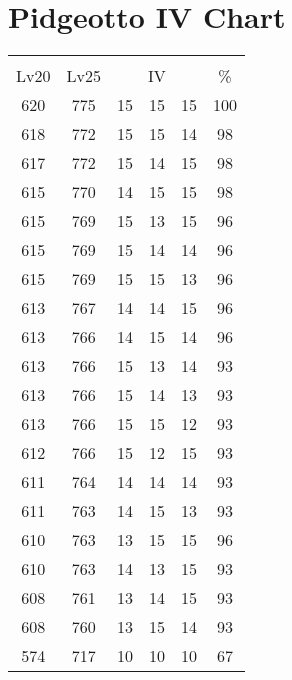 \documentclass{article}%
\begin{document}
%
\normalsize%
\section{Pidgeotto IV Chart}%
\label{sec:Pidgeotto IV Chart}%
\renewcommand{\arraystretch}{1.5}%
\begin{tabular}{|c|c|c|c|c|c|}%
\hline%
\multicolumn{6}{|c|}{\textcolor{white}{ 
\linebreak{Pidgeotto}
}%
\cellcolor{black}}\\%
\multicolumn{1}{|c}{Lv20}&\multicolumn{1}{c|}{Lv25}&\multicolumn{3}{c|}{IV}&\multicolumn{1}{|c|}{\%}\\%
\hline%
\rowcolor{color100}%
620&775&15&15&15&100\\%
\hline%
\rowcolor{color98}%
618&772&15&15&14&98\\%
\hline%
\rowcolor{color98}%
617&772&15&14&15&98\\%
\hline%
\rowcolor{color98}%
615&770&14&15&15&98\\%
\hline%
\rowcolor{color96}%
615&769&15&13&15&96\\%
\hline%
\rowcolor{color96}%
615&769&15&14&14&96\\%
\hline%
\rowcolor{color96}%
615&769&15&15&13&96\\%
\hline%
\rowcolor{color96}%
613&767&14&14&15&96\\%
\hline%
\rowcolor{color96}%
613&766&14&15&14&96\\%
\hline%
\rowcolor{color93}%
613&766&15&13&14&93\\%
\hline%
\rowcolor{color93}%
613&766&15&14&13&93\\%
\hline%
\rowcolor{color93}%
613&766&15&15&12&93\\%
\hline%
\rowcolor{color93}%
612&766&15&12&15&93\\%
\hline%
\rowcolor{color93}%
611&764&14&14&14&93\\%
\hline%
\rowcolor{color93}%
611&763&14&15&13&93\\%
\hline%
\rowcolor{color96}%
610&763&13&15&15&96\\%
\hline%
\rowcolor{color93}%
610&763&14&13&15&93\\%
\hline%
\rowcolor{color93}%
608&761&13&14&15&93\\%
\hline%
\rowcolor{color93}%
608&760&13&15&14&93\\%
\hline%
\rowcolor{color91}%
574&717&10&10&10&67\\%
\end{tabular}

%
\end{document}
